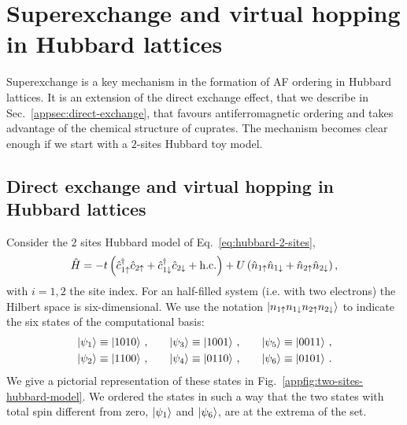 \def\GraphicsFolder{appendices/superexchange-virtual-hopping/pictures}

\chapter{Superexchange and virtual hopping in Hubbard lattices}\label{app:superexchange-virtual-hopping}
 
Superexchange is a key mechanism in the formation of AF ordering in Hubbard lattices. It is an extension of the direct exchange effect, that we describe in Sec.~\ref{appsec:direct-exchange}, that favours antiferromagnetic ordering and takes advantage of the chemical structure of cuprates. The mechanism becomes clear enough if we start with a $2$-sites Hubbard toy model.

\section{Direct exchange and virtual hopping in Hubbard lattices}\label{appsec:hubbard-2}

Consider the $2$ sites Hubbard model of Eq.~\eqref{eq:hubbard-2-sites},
\[
	\hat H = 
	-t \left(
		 \hat c_{1\uparrow}^\dagger \hat c_{2\uparrow} + \hat c_{1\downarrow}^\dagger \hat c_{2\downarrow} + \mathrm{h.c.} 
	\right)
	+ U \left(
		 \hat n_{1\uparrow} \hat n_{1\downarrow} + \hat n_{2\uparrow} \hat n_{2\downarrow} 
	\right),
\]
with $i=1,2$ the site index. For an half-filled system (i.e. with two electrons) the Hilbert space is six-dimensional. We use the notation $\ket{n_{1\uparrow} n_{1\downarrow} n_{2\uparrow} n_{2\downarrow}}$ to indicate the six states of the computational basis:
\begin{equation}\label{appeq:hubbard-2-states}
	\begin{aligned}
		\ket{\psi_1} &\equiv \ket{1010} \, , \\
		\ket{\psi_2} &\equiv \ket{1100} \, , \\
	\end{aligned}
	\qquad
	\begin{aligned}
		\ket{\psi_3} &\equiv \ket{1001} \, , \\
		\ket{\psi_4} &\equiv \ket{0110} \, , \\
	\end{aligned}
	\qquad
	\begin{aligned}
		\ket{\psi_5} &\equiv \ket{0011} \, , \\
		\ket{\psi_6} &\equiv \ket{0101} \, . \\
	\end{aligned}
\end{equation}
We give a pictorial representation of these states in Fig.~\ref{appfig:two-sites-hubbard-model}. We ordered the states in such a way that the two states with total spin different from zero, $\ket{\psi_1}$ and $\ket{\psi_6}$, are at the extrema of the set.

